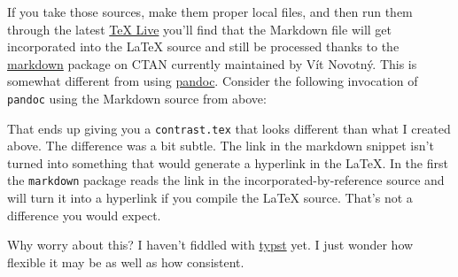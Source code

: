 \begin{Shaded}
\begin{Highlighting}[]
\NormalTok{\{\}}
\NormalTok{\{\}}
\NormalTok{\{\}}

\NormalTok{\{}
\NormalTok{\}}

\NormalTok{\{}\NormalTok{\}}
\NormalTok{\{}\NormalTok{\}}
\end{Highlighting}
\end{Shaded}

If you take those sources, make them proper local files, and then run
them through the latest \href{https://tug.org/texlive/}{TeX Live} you'll
find that the Markdown file will get incorporated into the LaTeX source
and still be processed thanks to the
\href{https://ctan.org/pkg/markdown}{markdown} package on CTAN currently
maintained by Vít Novotný. This is somewhat different from using
\href{https://pandoc.org}{pandoc}. Consider the following invocation of
\texttt{pandoc} using the Markdown source from above:

\begin{Shaded}
\begin{Highlighting}[]
 
\end{Highlighting}
\end{Shaded}

That ends up giving you a \texttt{contrast.tex} that looks different
than what I created above. The difference was a bit subtle. The link in
the markdown snippet isn't turned into something that would generate a
hyperlink in the LaTeX. In the first the \texttt{markdown} package reads
the link in the incorporated-by-reference source and will turn it into a
hyperlink if you compile the LaTeX source. That's not a difference you
would expect.

Why worry about this? I haven't fiddled with
\href{https://typst.app}{typst} yet. I just wonder how flexible it may
be as well as how consistent.

